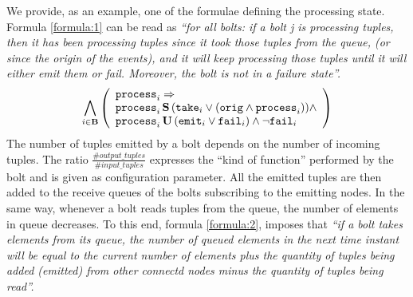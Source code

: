 %	
%	
%	
%	
We provide, as an example, one of the formulae defining the processing state. Formula \ref{formula:1} can be read as \textit{``for all bolts: if a bolt j is processing tuples, then it has been processing tuples since it took those tuples from the queue, (or since the origin of the events), and it will keep processing those tuples until it will either emit them or fail. Moreover, the bolt is not in a failure state''.}
\begin{align}
\small
%
\bigwedge_{
	i \in \mathbf{B} } 
\left( 
\begin{array}{l}
\p{i} \Rightarrow \\
\p{i} \, \Snc \, ( \ta{i} \lor (\ori \land \p{i})) \land \\
\p{i} \, \U \, (\e{i} \lor \f{i}) \land \lnot \f{i} 
\end{array}
\right) \label{formula:1} 
%
\end{align}
The number of tuples emitted by a bolt depends on the number of incoming tuples. The ratio $\frac{\#output\_tuples}{\#input\_tuples}$ %
expresses the ``kind of function''  performed by the bolt and is given as configuration parameter. 
All the emitted tuples are then added to the receive queues of the bolts subscribing to the emitting nodes.
In the same way, whenever a bolt reads tuples from the queue, the number of elements in queue decreases. To this end, formula \ref{formula:2}, imposes that \textit{``if a bolt takes elements from its queue, the number of queued elements in the next time instant will be equal to the current number of elements plus the quantity of tuples being added (emitted) from other connectd nodes minus the quantity of tuples being read''.}
